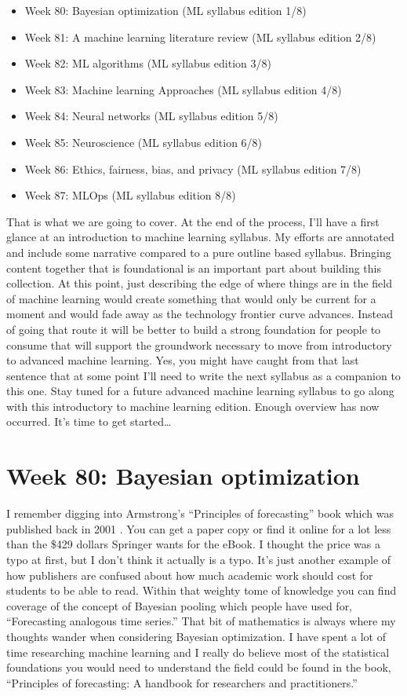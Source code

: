 \documentclass{article}
\begin{document}
\begin{itemize}
\item Week 80: Bayesian optimization (ML syllabus edition 1/8)
\item Week 81: A machine learning literature review (ML syllabus edition 2/8)
\item Week 82: ML algorithms (ML syllabus edition 3/8)
\item Week 83: Machine learning Approaches (ML syllabus edition 4/8)
\item Week 84: Neural networks (ML syllabus edition 5/8)
\item Week 85: Neuroscience (ML syllabus edition 6/8)
\item Week 86: Ethics, fairness, bias, and privacy (ML syllabus edition 7/8)
\item Week 87: MLOps (ML syllabus edition 8/8)
\end{itemize}

That is what we are going to cover. At the end of the process, I’ll have a first glance at an introduction to machine learning syllabus. My efforts are annotated and include some narrative compared to a pure outline based syllabus. Bringing content together that is foundational is an important part about building this collection. At this point, just describing the edge of where things are in the field of machine learning would create something that would only be current for a moment and would fade away as the technology frontier curve advances. Instead of going that route it will be better to build a strong foundation for people to consume that will support the groundwork necessary to move from introductory to advanced machine learning. Yes, you might have caught from that last sentence that at some point I’ll need to write the next syllabus as a companion to this one. Stay tuned for a future advanced machine learning syllabus to go along with this introductory to machine learning edition. Enough overview has now occurred. It’s time to get started…

\section{Week 80: Bayesian optimization}
I remember digging into Armstrong’s “Principles of forecasting” book which was published back in 2001 \cite{armstrong2001principles}. You can get a paper copy or find it online for a lot less than the \$429 dollars Springer wants for the eBook. I thought the price was a typo at first, but I don’t think it actually is a typo. It’s just another example of how publishers are confused about how much academic work should cost for students to be able to read. Within that weighty tome of knowledge you can find coverage of the concept of Bayesian pooling which people have used for, “Forecasting analogous time series.” That bit of mathematics is always where my thoughts wander when considering Bayesian optimization. I have spent a lot of time researching machine learning and I really do believe most of the statistical foundations you would need to understand the field could be found in the book, “Principles of forecasting: A handbook for researchers and practitioners.” 
\end{document}
